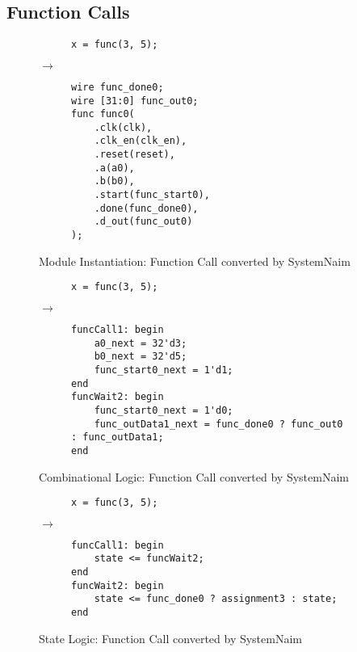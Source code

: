 \subsection{Function Calls}

\begin{figure}[H]
\centering
\begin{subfigure}{0.25\textwidth}
    \centering
    \begin{verbatim}
x = func(3, 5);
\end{verbatim}
\end{subfigure}%
{\LARGE$\rightarrow$}%
\begin{subfigure}{0.4\textwidth}
    \begin{verbatim}
wire func_done0;
wire [31:0] func_out0;
func func0(
    .clk(clk),
    .clk_en(clk_en),
    .reset(reset),
    .a(a0),
    .b(b0),
    .start(func_start0),
    .done(func_done0),
    .d_out(func_out0)
);
    \end{verbatim}
\end{subfigure}
\caption{Module Instantiation: Function Call converted by SystemNaim}
\label{sn:func_call_mdl}
\end{figure}

\begin{figure}[H]
\centering
\begin{subfigure}{0.25\textwidth}
    \centering
    \begin{verbatim}
x = func(3, 5);
\end{verbatim}
\end{subfigure}%
{\LARGE$\rightarrow$}%
\begin{subfigure}{0.55\textwidth}
    \begin{verbatim}
funcCall1: begin
    a0_next = 32'd3;
    b0_next = 32'd5;
    func_start0_next = 1'd1;
end
funcWait2: begin
    func_start0_next = 1'd0;
    func_outData1_next = func_done0 ? func_out0 : func_outData1;
end
    \end{verbatim}
\end{subfigure}
\caption{Combinational Logic: Function Call converted by SystemNaim}
\label{sn:func_call_comb}
\end{figure}

\begin{figure}[H]
\centering
\begin{subfigure}{0.25\textwidth}
    \centering
    \begin{verbatim}
x = func(3, 5);
\end{verbatim}
\end{subfigure}%
{\LARGE$\rightarrow$}%
\begin{subfigure}{0.55\textwidth}
    \begin{verbatim}
funcCall1: begin
    state <= funcWait2;
end
funcWait2: begin
    state <= func_done0 ? assignment3 : state;
end
    \end{verbatim}
\end{subfigure}
\caption{State Logic: Function Call converted by SystemNaim}
\label{sn:func_call_state}
\end{figure}


